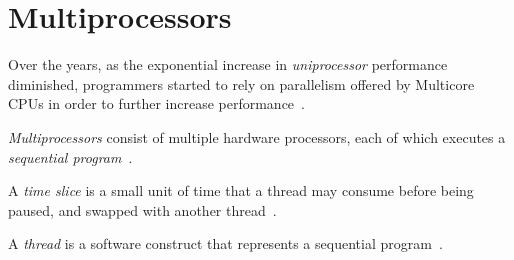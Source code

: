 



\section{Multiprocessors}
Over the years, as the exponential increase in \emph{uniprocessor} performance
diminished, programmers started to rely on parallelism offered by Multicore
CPUs in order to further increase performance~\cite{cantrill2008real}.

\begin{definition}[Multiprocessor]
    \emph{Multiprocessors} consist of multiple hardware processors, each of which
    executes a \emph{sequential program}~\cite[Appendix~B.2]{herlihy2020art}.
\end{definition}

\begin{definition}
    A \emph{time slice} is a small unit of time that a thread may consume
    before being paused, and swapped with another thread~\cite{osconcepts2021}.
\end{definition}

\begin{definition}[Thread]
    A \emph{thread} is a software construct that represents a sequential program~\cite[Appendix~B.2]{herlihy2020art}.
\end{definition}

